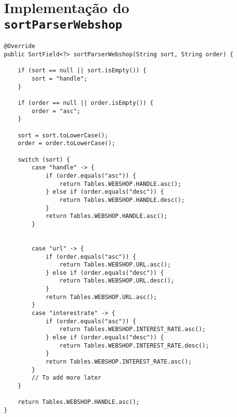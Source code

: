 \chapter{Implementação do \texttt{sortParserWebshop}}\label{an2}

\begin{lstlisting}[frame=bt,numbers=none]
@Override
public SortField<?> sortParserWebshop(String sort, String order) {

	if (sort == null || sort.isEmpty()) {
		sort = "handle";
	}

	if (order == null || order.isEmpty()) {
		order = "asc";
	}

	sort = sort.toLowerCase();
	order = order.toLowerCase();

	switch (sort) {
		case "handle" -> {
			if (order.equals("asc")) {
				return Tables.WEBSHOP.HANDLE.asc();
			} else if (order.equals("desc")) {
				return Tables.WEBSHOP.HANDLE.desc();
			}
			return Tables.WEBSHOP.HANDLE.asc();
		}

		
		case "url" -> {
			if (order.equals("asc")) {
				return Tables.WEBSHOP.URL.asc();
			} else if (order.equals("desc")) {
				return Tables.WEBSHOP.URL.desc();
			}
			return Tables.WEBSHOP.URL.asc();
		}
		case "interestrate" -> {
			if (order.equals("asc")) {
				return Tables.WEBSHOP.INTEREST_RATE.asc();
			} else if (order.equals("desc")) {
				return Tables.WEBSHOP.INTEREST_RATE.desc();
			}
			return Tables.WEBSHOP.INTEREST_RATE.asc();
		}
		// To add more later
	}

	return Tables.WEBSHOP.HANDLE.asc();
}
\end{lstlisting}